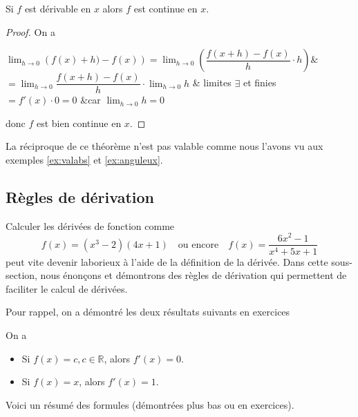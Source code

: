 \documentclass[a4paper,12pt]{article}
\begin{document}
\begin{thm}
		\tcblower
Si $f$ est dérivable en $x$ alors $f$ est continue en $x$.

\begin{proof}
	On a

	\begin{explanation}[0.75]
	$\displaystyle{\lim_{h\to0}\left( f(x)+h)-f(x)\right)}=\displaystyle{\lim_{h\to 0}\left(\dfrac{f(x+h)-f(x)}{h}\cdot h\right)}$&\\
	$=\displaystyle{\lim_{h\to 0}\dfrac{f(x+h)-f(x)}{h}\cdot\lim_{h\to 0}h} $ & limites $\exists$ et finies\\
			$=f'(x)\cdot 0=0$ &car $\displaystyle{\lim_{h\to 0}h=0}$
\end{explanation}
donc $f$ est bien continue en $x$.
\end{proof}
\end{thm}
\begin{remarque}
	\tcblower
	La réciproque de ce théorème n'est pas valable comme nous l'avons vu aux exemples \ref{ex:valabs} et \ref{ex:anguleux}.
\end{remarque}


\subsection{Règles de dérivation}
Calculer les dérivées de fonction comme
\[f(x)=(x^3-2)(4x+1)\quad \text{ou encore} \quad f(x)=\dfrac{6x^2-1}{x^4+5x+1}\]
peut vite devenir laborieux à l'aide de la définition de la dérivée. Dans cette sous-section, nous énonçons et démontrons des règles de dérivation qui permettent de faciliter le calcul de dérivées. 

Pour rappel, on a démontré les deux résultats suivants en exercices
\begin{prop}
		\tcblower	
	On a 
	\begin{itemize}
		\item Si $f(x)=c, c\in\mathbb{R}$, alors $f'(x)=0$. 
		\item Si $f(x)=x$, alors $f'(x)=1$. 
	\end{itemize}
\end{prop}

Voici un résumé des formules (démontrées plus bas ou en exercices). 
\end{document}
